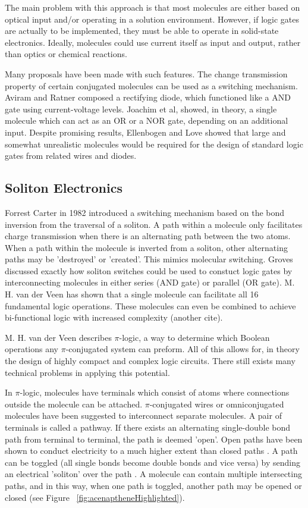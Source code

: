 \documentclass[12pt]{article}
\begin{document}
The main problem with this approach is that most molecules are either based on optical input and/or operating in a solution environment. However, if logic gates are actually to be implemented, they must be able to operate in solid-state electronics. Ideally, molecules could use current itself as input and output, rather than optics or chemical reactions. 

Many proposals have been made with such features. The change transmission property of certain conjugated molecules can be used as a switching mechanism. Aviram and Ratner composed a rectifying diode, which functioned like a AND gate using current-voltage levels. Joachim et al, showed, in theory, a single molecule which can act as an OR or a NOR gate, depending on an additional input. Despite promising results, Ellenbogen and Love showed that large and somewhat unrealistic molecules would be required for the design of standard logic gates from related wires and diodes. 

\subsection{Soliton Electronics}

Forrest Carter in 1982 introduced a switching mechanism based on the bond inversion from the traversal of a soliton. A path within a molecule only  facilitates charge transmission when there is an alternating path between the two atoms. When a path within the molecule is inverted from a soliton, other alternating paths may be 'destroyed' or 'created'. This mimics molecular switching.  Groves discussed exactly how soliton switches could be used to constuct logic gates by interconnecting molecules in either series (AND gate) or parallel (OR gate). M. H.  van der Veen \cite{v06} has shown that a single molecule can facilitate all 16 fundamental logic operations. These molecules can even be combined to achieve bi-functional logic with increased complexity (another cite).

M. H. van der Veen \cite{v06} describes $\pi$-logic, a way to determine which Boolean operations any $\pi$-conjugated system can preform. All of this allows for, in theory the design of highly compact and complex logic circuits. There still exists many technical problems in applying this potential.

In $\pi$-logic, molecules have terminals which consist of atoms where connections outside the molecule can be attached. $\pi$-conjugated wires \cite{9} or omniconjugated molecules \cite{OmniConj} have been suggested to interconnect separate molecules. A pair of terminals is called a pathway. If there exists an alternating single-double bond path from terminal to terminal, the path is deemed 'open'. Open paths have been shown to conduct electricity to a much higher extent than closed paths \cite{openPath}. A path can be toggled (all single bonds become double bonds and vice versa) by sending an electrical 'soliton' over the path \cite{HK88}. A molecule can contain multiple intersecting paths, and in this way, when one path is toggled, another path may be opened or closed (see Figure ~\ref{fig:acenaptheneHighlighted}).
\end{document}
